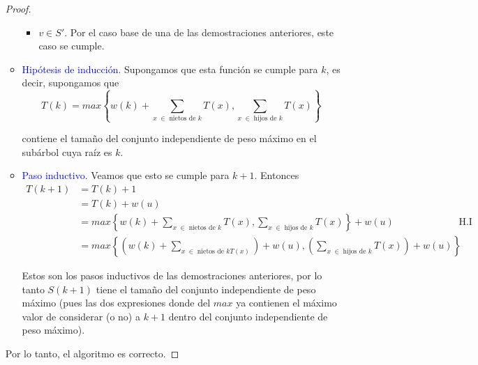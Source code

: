 \documentclass[letterpaper,11pt]{article}
\begin{document}
\begin{enumerate}
\begin{proof}
\begin{itemize}
\begin{itemize}
                \item $v \in S'$. Por el caso base de una de las demostraciones
                anteriores, este caso se cumple.
            \end{itemize}

            \item \textcolor{blue}{Hipótesis de inducción}. Supongamos que 
            esta función se cumple para $k$, es decir, supongamos que 
            \begin{equation*}
                T(k) = max \left\{w(k) + \sum_{x \; \in \;
                \text{nietos de $k$}} T(x), \sum_{x \; \in \; 
                \text{hijos de $k$}} T(x) \right\} 
            \end{equation*}

            contiene el tamaño del conjunto independiente de peso máximo en 
            el subárbol cuya raíz es $k$.

            \item \textcolor{blue}{Paso inductivo}. Veamos que esto se cumple 
            para $k+1$. Entonces 
            \begin{align*}
                T(k+1) 
                &= T(k) + 1 \\
                &= T(k) + w(u) \\ 
                &= max \left\{w(k) + \sum_{x \; \in \; \text{nietos de $k$}} 
                T(x), \sum_{x \; \in \; \text{hijos de $k$}} T(x) \right\}
                + w(u)
                && \text{H.I} \\
                &= max \left\{
                    \left(w(k) + \sum_{x \; \in \; \text{nietos de $k$} T(x)} 
                    \right) + w(u), 
                    \left(\sum_{x \; \in \; \text{hijos de $k$}} T(x) \right)
                    + w(u) \right\}
            \end{align*}

            Estos son los pasos inductivos de las demostraciones anteriores, 
            por lo tanto $S(k+1)$ tiene el tamaño del conjunto independiente
            de peso máximo (pues las dos expresiones donde del $max$ ya 
            contienen el máximo valor de considerar (o no) a $k+1$ dentro del 
            conjunto independiente de peso máximo). 
        \end{itemize}

        Por lo tanto, el algoritmo es correcto.

    \end{proof}


\end{enumerate}
\end{document}
